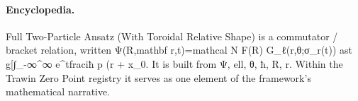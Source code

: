 \paragraph{Encyclopedia.}
Full Two-Particle Ansatz (With Toroidal Relative Shape) is a commutator / bracket relation, written Ψ(R,mathbf r,t)=mathcal N F(R) G\_ℓ(r,θ;σ\_r(t)) ast g[∫\_-∞\textasciicircum{}∞ e\textasciicircum{}tfraciħ p (r + x\_0. It is built from Ψ, ell, θ, ħ, R, r. Within the Trawin Zero Point registry it serves as one element of the framework's mathematical narrative.

